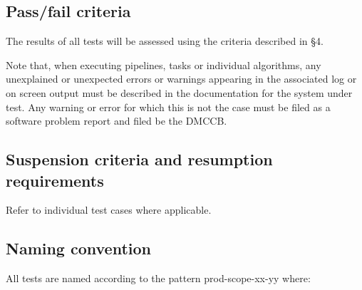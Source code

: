 \documentclass[DM,lsstdraft,STS,toc]{lsstdoc}
\begin{document}
\subsection{Pass/fail criteria}
\label{sec:passfail}

The results of all tests will be assessed using the criteria described in
 \S4.

Note that, when executing pipelines, tasks or individual algorithms, any
unexplained or unexpected errors or warnings appearing in the associated log
or on screen output must be described in the documentation for the system
under test.  Any warning or error for which this is not the case must be filed
as a software problem report and filed be the DMCCB.

\subsection{Suspension criteria and resumption requirements}
\label{suspension}

Refer to individual test cases where applicable.

\subsection{Naming convention}

All tests are named according to the pattern prod-scope-xx-yy where:
\end{document}
